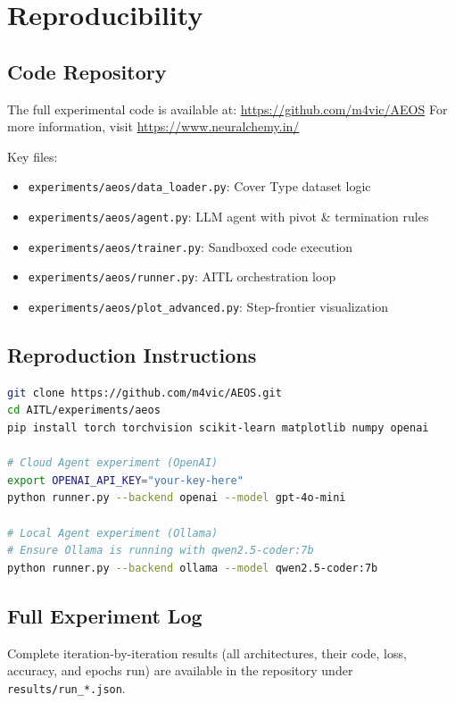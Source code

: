\documentclass[11pt]{article}
\begin{document}
\section{Reproducibility}
\label{sec:appendix}

\subsection{Code Repository}

The full experimental code is available at: \url{https://github.com/m4vic/AEOS}
For more information, visit \url{https://www.neuralchemy.in/}

Key files:
\begin{itemize}[nosep]
  \item \texttt{experiments/aeos/data\_loader.py}: Cover Type dataset logic
  \item \texttt{experiments/aeos/agent.py}: LLM agent with pivot \& termination rules
  \item \texttt{experiments/aeos/trainer.py}: Sandboxed code execution
  \item \texttt{experiments/aeos/runner.py}: AITL orchestration loop
  \item \texttt{experiments/aeos/plot\_advanced.py}: Step-frontier visualization
\end{itemize}

\subsection{Reproduction Instructions}

\begin{lstlisting}[language=bash]
git clone https://github.com/m4vic/AEOS.git
cd AITL/experiments/aeos
pip install torch torchvision scikit-learn matplotlib numpy openai

# Cloud Agent experiment (OpenAI)
export OPENAI_API_KEY="your-key-here"
python runner.py --backend openai --model gpt-4o-mini

# Local Agent experiment (Ollama)
# Ensure Ollama is running with qwen2.5-coder:7b
python runner.py --backend ollama --model qwen2.5-coder:7b
\end{lstlisting}

\subsection{Full Experiment Log}

Complete iteration-by-iteration results (all architectures, their code, loss, accuracy, and epochs run) are available in the repository under \texttt{results/run\_*.json}.
\end{document}
